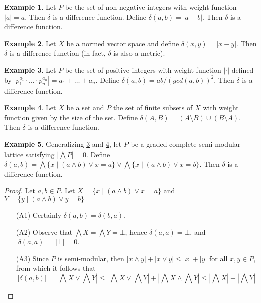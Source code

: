 \documentclass[acmsmall,review,anonymous]{acmart}\settopmatter{printfolios=true,printccs=false,printacmref=false}
\theoremstyle{definition}
\newtheorem{example}{Example}
\begin{document}
\begin{example}\label{naturalnumbers}
Let $P$ be the set of non-negative integers with weight function $|a| = a$. Then
$\delta$ is a difference function.
Define $\delta(a, b) = |a-b|$. Then $\delta$ is a difference function.
\end{example}
\begin{example}
Let $X$ be a normed vector space and define $\delta(x, y) = |x-y|$. Then
$\delta$ is a difference function (in fact, $\delta$ is also a metric).
\end{example}
\begin{example}\label{divisibility}
Let $P$ be the set of positive integers with weight function $|\cdot|$ defined
by $|p_1^{a_1} \cdot \ldots \cdot p_n^{a_n}| = a_1 + \ldots + a_n$. Define
$\delta(a, b) = ab/(gcd(a, b))^2$.
Then $\delta$ is a difference function.
\end{example}
\begin{example}\label{boolean}
Let $X$ be a set and $P$ the set of finite subsets of $X$ with weight function
given by the size of the set. Define $\delta(A, B) = (A \setminus B) \cup (B
\setminus A)$. Then $\delta$ is a difference function.
\end{example}
\begin{example}\label{general}
Generalizing \cref{divisibility} and
\cref{boolean}, let $P$ be a graded complete semi-modular lattice satisfying
$|\bigwedge P|=0$. Define $\delta(a, b) = \bigwedge \{x \; | \; (a \wedge b)
\vee x = a\} \vee \bigwedge \{x \; | \; (a \wedge b) \vee x = b\}$. Then
$\delta$ is a difference function.
\end{example}
\begin{proof}
Let $a, b \in P$. Let $X = \{x \; | \; (a \wedge b) \vee x = a\}$ and $Y = \{y
\; | \; (a \wedge b) \vee y = b\}$
\begin{enumerate}
  \item[(A1)]
  Certainly $\delta(a, b) = \delta(b, a)$.
  \item[(A2)]
  Observe that $\bigwedge X = \bigwedge Y = \bot$, hence $\delta(a,
  a) = \bot$, and $|\delta(a, a)| = |\bot| = 0$.
  \item[(A3)]
  Since $P$ is semi-modular, then $|x \wedge y| + |x \vee y| \leq |x| + |y|$
  for all $x, y \in P$, from which it follows that $$|\delta(a, b)| =
  \left|\bigwedge X \vee \bigwedge Y\right| \leq \left|\bigwedge X \vee
  \bigwedge Y\right| + \left|\bigwedge X \wedge \bigwedge Y\right| \leq
  \left|\bigwedge X\right| + \left|\bigwedge Y\right|$$
\end{enumerate}
\end{proof}
\fi
\end{document}
